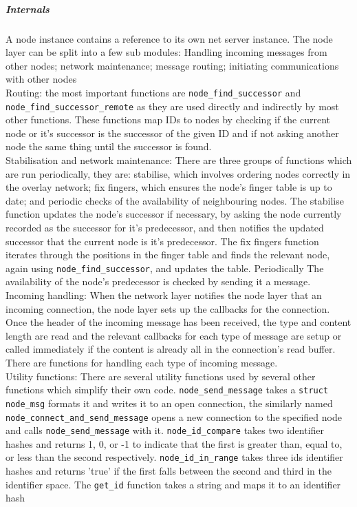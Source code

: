 \documentclass{article}
\begin{document}
\subparagraph{Internals}
A node instance contains a reference to its own net server instance.
The node layer can be split into a few sub modules: Handling incoming messages from other nodes; network maintenance; message routing; initiating communications with other nodes
\\
Routing: the most important functions are \texttt{node\_find\_successor} and \\\texttt{node\_find\_successor\_remote} as they are used directly and indirectly by most other functions. These functions map IDs to nodes by checking if the current node or it's successor is the successor of the given ID and if not asking another node the same thing until the successor is found.
\\
Stabilisation and network maintenance: There are three groups of functions which are run periodically, they are: stabilise, which involves ordering nodes correctly in the overlay network; fix fingers, which ensures the node's finger table is up to date; and periodic checks of the availability of neighbouring nodes.
The stabilise function updates the node's successor if necessary, by asking the node currently recorded as the successor for it's predecessor, and then notifies the updated successor that the current node is it's predecessor.
The fix fingers function iterates through the positions in the finger table and finds the relevant node, again using \texttt{node\_find\_successor}, and updates the table.
Periodically The availability of the node's predecessor is checked by sending it a message.
\\
Incoming handling: When the network layer notifies the node layer that an incoming connection, the node layer sets up the callbacks for the connection. Once the header of the incoming message has been received, the type and content length are read and the relevant callbacks for each type of message are setup or called immediately if the content is already all in the connection's read buffer. There are functions for handling each type of incoming message.
\\
Utility functions: There are several utility functions used by several other functions which simplify their own code.
\texttt{node\_send\_message} takes a \texttt{struct node\_msg} formats it and writes it to an open connection, the similarly named \texttt{node\_connect\_and\_send\_message} opens a new connection to the specified node and calls \texttt{node\_send\_message} with it.
\texttt{node\_id\_compare} takes two identifier hashes and returns 1, 0, or -1 to indicate that the first is greater than, equal to, or less than the second respectively.
\texttt{node\_id\_in\_range} takes three ids identifier hashes and returns 'true' if the first falls between the second and third in the identifier space.
The \texttt{get\_id} function takes a string and maps it to an identifier hash
\end{document}
